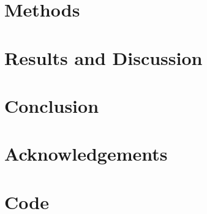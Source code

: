 \documentclass{report}
\begin{document}
  \chapter{Methods}
  

  \chapter{Results and Discussion}
  


  \chapter{Conclusion}

  \chapter*{Acknowledgements}

  \printbibliography[title=References]


  \appendix
  \chapter{Code}
\end{document}
